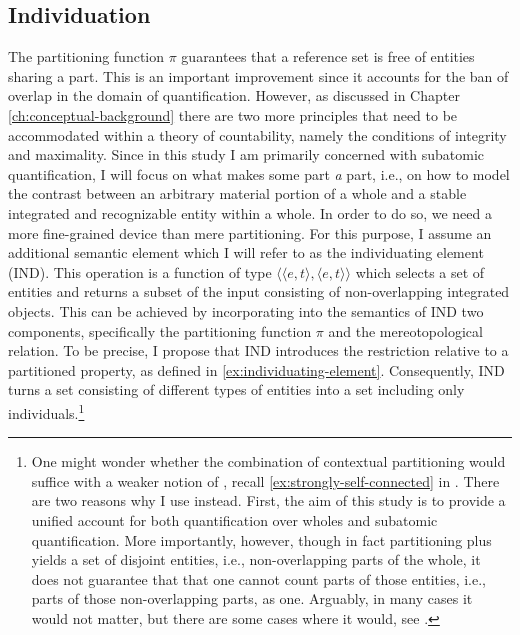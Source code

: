 	\subsection{Individuation}\label{sec:individuation}
	
	The partitioning function $\pi$ guarantees that a reference set is free of entities sharing a part. This is an important improvement since it accounts for the ban of overlap in the domain of quantification. However, as discussed in Chapter \ref{ch:conceptual-background} there are two more principles that need to be accommodated within a theory of countability, namely the conditions of integrity and maximality. Since in this study I am primarily concerned with subatomic quantification, I will focus on what makes some part \textit{a} part, i.e., on how to model the contrast between an arbitrary material portion of a whole and a stable integrated and recognizable entity within a whole. In order to do so, we need a more fine-grained device than mere partitioning. For this purpose, I assume an additional semantic element which I will refer to as the individuating element (IND). This operation is a function of type $\langle\langle e,t\rangle,\langle e,t\rangle\rangle$ which selects a set of entities and returns a subset of the input consisting of non-overlapping integrated objects. This can be achieved by incorporating into the semantics of IND two components, specifically the partitioning function $\pi$ and the mereotopological  relation. To be precise, I propose that IND introduces the  restriction relative to a partitioned property, as defined in \ref{ex:individuating-element}. Consequently, IND turns a set consisting of different types of entities into a set including only  individuals.\footnote{One might wonder whether the combination of contextual partitioning would suffice with a weaker notion of , recall \ref{ex:strongly-self-connected} in . There are two reasons why I use  instead. First, the aim of this study is to provide a unified account for both quantification over wholes and subatomic quantification. More importantly, however, though in fact partitioning plus  yields a set of disjoint entities, i.e., non-overlapping parts of the whole, it does not guarantee that that one cannot count  parts of those entities, i.e., parts of those non-overlapping parts, as one. Arguably, in many cases it would not matter, but there are some cases where it would, see .}
	
